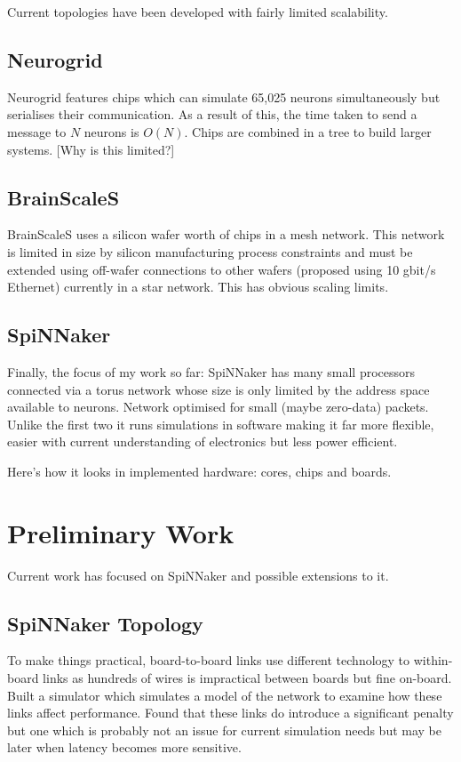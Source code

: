 Current topologies have been developed with fairly limited scalability.

\subsection{Neurogrid}

Neurogrid features chips which can simulate 65,025 neurons simultaneously but
serialises their communication. As a result of this, the time taken to send a
message to $N$ neurons is $O(N)$. Chips are combined in a tree to build larger
systems. [Why is this limited?]

\subsection{BrainScaleS}

BrainScaleS uses a silicon wafer worth of chips in a mesh network. This network
is limited in size by silicon manufacturing process constraints and must be
extended using off-wafer connections to other wafers (proposed using 10 gbit/s
Ethernet) currently in a star network. This has obvious scaling limits.

\subsection{SpiNNaker}

Finally, the focus of my work so far: SpiNNaker has many small processors
connected via a torus network whose size is only limited by the address space
available to neurons. Network optimised for small (maybe zero-data) packets.
Unlike the first two it runs simulations in software making it far more
flexible, easier with current understanding of electronics but less power
efficient.

Here's how it looks in implemented hardware: cores, chips and boards.

\section{Preliminary Work}

Current work has focused on SpiNNaker and possible extensions to it.

\subsection{SpiNNaker Topology}

To make things practical, board-to-board links use different technology to
within-board links as hundreds of wires is impractical between boards but fine
on-board. Built a simulator which simulates a model of the network to examine
how these links affect performance. Found that these links do introduce a
significant penalty but one which is probably not an issue for current
simulation needs but may be later when latency becomes more sensitive.

